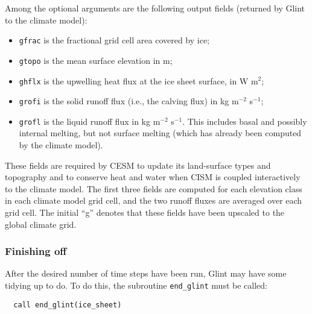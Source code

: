 Among the optional arguments are the following output fields (returned by Glint to the climate model):
\begin{itemize}
\item \texttt{gfrac} is the fractional grid cell area covered by ice;
\item \texttt{gtopo} is the mean surface elevation in m;
\item \texttt{ghflx} is the upwelling heat flux at the ice sheet surface, in W m$^2$;
\item \texttt{grofi} is the solid runoff flux (i.e., the calving flux) in kg m$^{-2}$ s$^{-1}$;
\item \texttt{grofl} is the liquid runoff flux in kg m$^{-2}$ s$^{-1}$.
This includes basal and possibly internal melting, but not surface melting
(which has already been computed by the climate model).
\end{itemize}
%
These fields are required by CESM to update its land-surface types and topography and to conserve heat
and water when CISM is coupled interactively to the climate model.  
The first three fields are computed for each elevation class in each climate model grid cell,
and the two runoff fluxes are averaged over each grid cell.
The initial ``g'' denotes that these fields have been upscaled to the global climate grid.
%
\subsubsection{Finishing off}
%
After the desired number of time steps have been run, Glint may have some
tidying up to do. To do this, the subroutine \texttt{end\_glint}
must be called:
%
\begin{verbatim}
  call end_glint(ice_sheet)
\end{verbatim}
%
%
%
